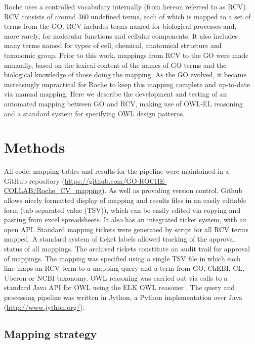 \documentclass[runningheads,a4paper]{llncs}
\begin{document}
{{Roche uses a controlled vocabulary internally (from hereon referred to as RCV).  RCV consists of around 360 undefined terms, each of which is mapped to a set of terms from the \ac{GO}. RCV includes terms named for biological processes and, more rarely, for molecular functions and cellular components.  It also includes many terms named for types of cell, chemical, anatomical structure and taxonomic group. Prior to this work, mappings from RCV to the \ac{GO} were made manually, based on the lexical content of the names of \ac{GO} terms and the biological knowledge of those doing the mapping.  As the \ac{GO} evolved, it became increasingly impractical for Roche to keep this mapping complete and up-to-date via manual mapping.
%
Here we describe the development and testing of an automated mapping between \ac{GO} and RCV, making use of OWL-EL reasoning and a standard system for specifying OWL design patterns.


\section{Methods}

All code, mapping tables and results for the pipeline were maintained in a GitHub repository (\url{https://github.com/GO-ROCHE-COLLAB/Roche_CV_mapping}). As well as providing version control, Github allows nicely formatted display of mapping and results files in an easily editable form (tab separated value (TSV)), which can be easily edited via copying and pasting from excel spreadsheets. It also has an integrated ticket system, with an open API.  Standard mapping tickets were generated by script for all RCV terms mapped. A standard system of ticket labels allowed tracking of the approval status of all mappings.  The archived tickets constitute an audit trail for approval of mappings.
%
The mapping was specified using a single TSV file in which each line maps an RCV term to a mapping query and a term from \ac{GO}, ChEBI, CL, Uberon or NCBI taxonomy.
%
OWL reasoning was carried out via calls to a standard Java API for OWL using the ELK OWL reasoner \cite{kazakov2012}.  The query and processing pipeline was written in Jython, a Python implementation over Java (\url{http://www.jython.org/}).  %

\subsection{Mapping strategy}

}}
\end{document}
